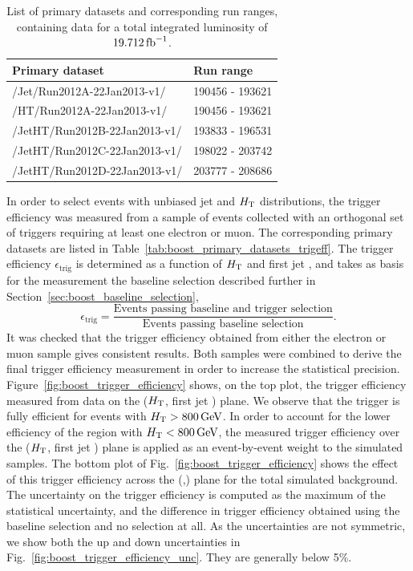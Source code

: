 \begin{table}[htdp]
\caption{List of primary datasets and corresponding run ranges, containing data for a total
integrated luminosity of $19.712\mbox{\ensuremath{\,\text{fb}^\text{$-$1}}}$.}
\begin{center}
\begin{tabular}{ l l }
\toprule
Primary dataset & Run range \\
\midrule
/Jet/Run2012A-22Jan2013-v1/ & 190456 - 193621 \\
/HT/Run2012A-22Jan2013-v1/  & 190456 - 193621 \\
/JetHT/Run2012B-22Jan2013-v1/ & 193833 - 196531 \\
/JetHT/Run2012C-22Jan2013-v1/ & 198022 - 203742 \\
/JetHT/Run2012D-22Jan2013-v1/ & 203777 - 208686  \\
\bottomrule
\end{tabular}
\end{center}
\label{tab:boost_primary_datasets}
\end{table}


In order to select events with unbiased jet \pt and $H_{\mathrm{T}}$ distributions,
the trigger efficiency was measured from a sample of events collected with an orthogonal set of
triggers requiring at least one electron or muon. The corresponding primary datasets are listed in
Table~\ref{tab:boost_primary_datasets_trigeff}. 
The trigger efficiency $\epsilon_\textrm{trig}$ is determined as a function of $H_{\mathrm{T}}$ and first jet
\pt, and takes as basis for the measurement the baseline selection described further in
Section~\ref{sec:boost_baseline_selection},
\begin{equation}
  \epsilon_\textrm{trig} = \frac{\textrm{Events passing baseline and trigger selection}}
{\textrm{Events passing baseline selection}}.
\end{equation}
It was checked that the trigger efficiency obtained from either the electron or muon sample gives 
consistent results. Both samples were combined to derive the final trigger efficiency measurement in 
order to increase the statistical precision.
Figure~\ref{fig:boost_trigger_efficiency} shows, on the top plot, the trigger efficiency
measured from data on the ($H_{\mathrm{T}}$, first jet \pt) plane.
We observe that the trigger is fully efficient for events with $H_{\mathrm{T}} > 800\,\text{Ge\hspace{-.08em}V}$.  
In order to account for the lower efficiency of the region with $H_{\mathrm{T}}  < 800\,\text{Ge\hspace{-.08em}V}$, the measured
trigger efficiency over the ($H_{\mathrm{T}}$, first jet \pt) plane is applied as an event-by-event weight
to the simulated samples. The bottom plot of Fig.~\ref{fig:boost_trigger_efficiency} shows the
effect of this trigger efficiency across the (\mr,\rsq) plane for the total simulated background. 
The uncertainty on the trigger efficiency is computed as the maximum of the statistical 
uncertainty, and the difference in trigger efficiency obtained using the baseline selection and no 
selection at all. As the uncertainties are not symmetric, we show both the up and down uncertainties
in Fig.~\ref{fig:boost_trigger_efficiency_unc}. They are generally below 5\%.   

